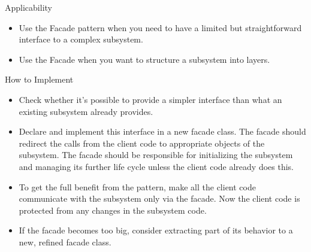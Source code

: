 \documentclass[13pt]{beamer}
\begin{document}
\begin{frame}{Applicability}
	\begin{itemize}
		\setlength\itemsep{1em}
		\item  Use the Facade pattern when you need to have a limited but straightforward interface to a complex subsystem.
		\item Use the Facade when you want to structure a subsystem into layers.
	\end{itemize}
\end{frame}

\begin{frame}{How to Implement}
	\begin{itemize}
		\setlength\itemsep{1em}
		\item Check whether it’s possible to provide a simpler interface than what an existing subsystem already provides. 
		\item Declare and implement this interface in a new facade class. The facade should redirect the calls from the client code to appropriate objects of the subsystem. The facade should be responsible for initializing the subsystem and managing its further life cycle unless the client code already does this.
		\item To get the full benefit from the pattern, make all the client code communicate with the subsystem only via the facade. Now the client code is protected from any changes in the subsystem code.
		\item If the facade becomes too big, consider extracting part of its behavior to a new, refined facade class.
	\end{itemize}
\end{frame}
\end{document}
